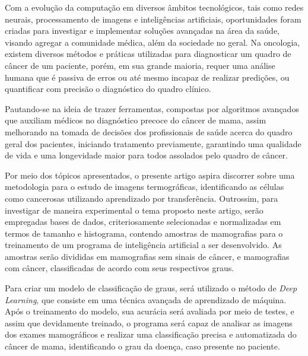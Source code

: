 Com a evolução da computação em diversos âmbitos tecnológicos, tais como redes neurais, processamento de imagens e inteligências artificiais, oportunidades foram criadas para investigar e implementar soluções avançadas na área da saúde, visando agregar a comunidade médica, além da sociedade no geral. Na oncologia, existem diversos métodos e práticas utilizadas para diagnosticar um quadro de câncer de um paciente, porém, em sua grande maioria, requer uma análise humana que é passiva de erros ou até mesmo incapaz de realizar predições, ou quantificar com precisão o diagnóstico do quadro clínico.

Pautando-se na ideia de trazer ferramentas, compostas por algoritmos avançados que auxiliam médicos no diagnóstico precoce do câncer de mama, assim melhorando na tomada de decisões dos profissionais de saúde acerca do quadro geral dos pacientes, iniciando tratamento previamente, garantindo uma qualidade de vida e uma longevidade maior para todos assolados pelo quadro de câncer.

Por meio dos tópicos apresentados, o presente artigo aspira discorrer sobre uma metodologia para o estudo de imagens termográficas, identificando as células como cancerosas utilizando aprendizado por transferência. Outrossim, para investigar de maneira experimental o tema proposto neste artigo, serão empregadas bases de dados, criteriosamente selecionadas e normalizadas em termos de tamanho e histograma, contendo amostras de mamografias para o treinamento de um programa de inteligência artificial a ser desenvolvido. As amostras serão divididas em mamografias sem sinais de câncer, e mamografias com câncer, classificadas de acordo com seus respectivos graus.

Para criar um modelo de classificação de graus, será utilizado o método de \textit{Deep Learning}, que consiste em uma técnica avançada de aprendizado de máquina. Após o treinamento do modelo, sua acurácia será avaliada por meio de testes, e assim que devidamente treinado, o programa será capaz de analisar as imagens dos exames mamográficos e realizar uma classificação precisa e automatizada do câncer de mama, identificando o grau da doença, caso presente no paciente.






